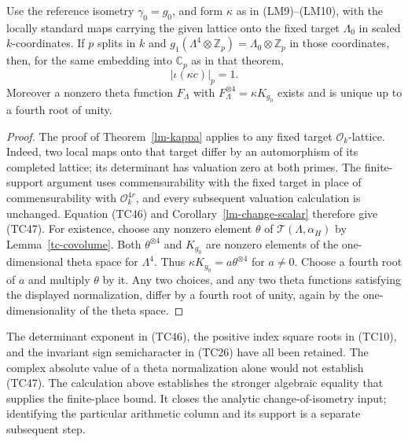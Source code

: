 \begin{corollary}\label{tc-normalized-unit}
Use the reference isometry $\gamma_0=g_0$, and form
$\kappa$ as in (LM9)--(LM10), with the locally standard
maps carrying the given lattice onto the fixed target
$\Lambda_0$ in scaled $k$-coordinates.
If $p$ splits in $k$ and
$g_1(\Lambda^4\otimes\mathbb Z_p)
=\Lambda_0\otimes\mathbb Z_p$ in those coordinates, then,
for the same
embedding into $\mathbb C_p$ as in that theorem,
\[
                         |\iota(\kappa c)|_p=1.
 \tag{TC47}
\]
Moreover a nonzero theta function $F_\Lambda$ with
$F_\Lambda^{\otimes4}=\kappa K_{g_0}$ exists and is unique
up to a fourth root of unity.
\end{corollary}
\begin{proof}
The proof of Theorem~\ref{lm-kappa} applies to any fixed
target $\mathcal O_k$-lattice.  Indeed, two local maps
onto that target differ by an automorphism of its completed
lattice; its determinant has valuation zero at both primes.
The finite-support argument uses commensurability with the
fixed target in place of commensurability with
$\mathcal O_k^{4r}$, and every subsequent valuation
calculation is unchanged.
Equation (TC46) and Corollary~\ref{lm-change-scalar}
therefore give (TC47).  For existence, choose any nonzero element $\theta$
of $\mathcal T(\Lambda,\alpha_H)$ by
Lemma~\ref{tc-covolume}.
Both $\theta^{\otimes4}$ and $K_{g_0}$ are nonzero elements
of the one-dimensional theta space for $\Lambda^4$.
Thus $\kappa K_{g_0}=a\theta^{\otimes4}$ for $a\ne0$.
Choose a fourth root of $a$ and multiply $\theta$ by it.
Any two choices, and any two theta functions satisfying
the displayed normalization, differ by a fourth root of
unity, again by the one-dimensionality of the theta space.
\end{proof}

The determinant exponent in (TC46), the positive index
square roots in (TC10), and the invariant sign semicharacter
in (TC26) have all been retained.  The complex absolute
value of a theta normalization alone would not establish
(TC47).  The calculation above establishes the stronger
algebraic equality that supplies the finite-place bound.
It closes the analytic change-of-isometry input; identifying
the particular arithmetic column and its support is a
separate subsequent step.


